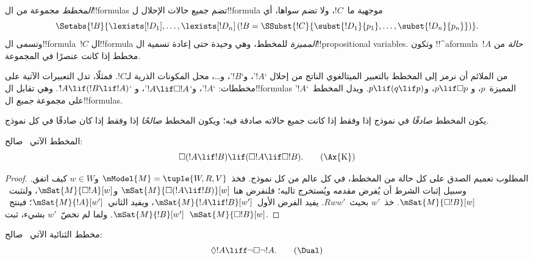 \documentclass[../../../include/open-logic-section]{subfiles}
\begin{document}


\begin{defn}
  \emph{المخطط} مجموعة من ال!!{formula}s تضم جميع حالات الإحلال
  ل!!{formula} موجهية ما~$!C$، ولا تضم سواها، أي
  \[
  \Setabs{!B}{\lexists[!D_1], \dots, \lexists[!D_n] \left(!B =
  \SSubst{!C}{\subst{!D_1}{p_1}, \dots, \subst{!D_n}{p_n}} \right) }.
  \]
  وتسمى ال!!{formula}~$!C$ ال!!{formula} \emph{المميزة} للمخطط، وهي
  وحيدة حتى إعادة تسمية ال!!{propositional variable}s. وتكون
  !!^a{formula}~$!A$ \emph{حالة} من مخطط إذا كانت عنصرًا في المجموعة.
\end{defn}

من الملائم أن نرمز إلى المخطط بالتعبير الميتالغوي الناتج من إحلال
`$!A$'، و`$!B$'، و\dots، محل المكونات الذرية لـ$!C$. فمثلًا، تدل
التعبيرات الآتية على مخططات: `$!A$'، و`$!A \lif \Box!A$'، و
`$!A \lif (!B \lif !A)$'. وهي تقابل ال!!{formula}s المميزة~$p$، و
$p \lif \Box p$، و$p \lif (q \lif p)$. ويدل المخطط~`$!A$' على
مجموعة \emph{جميع} ال!!{formula}s.

\begin{defn}
  يكون المخطط \emph{صادقًا} في نموذج إذا وفقط إذا كانت جميع حالاته
  صادقة فيه؛ ويكون المخطط \emph{صالحًا} إذا وفقط إذا كان صادقًا في كل
  نموذج.
\end{defn}

\begin{prop}
  المخطط الآتي~ صالح:
  \begin{equation*}
  \Box(!A \lif !B) \lif (\Box !A \lif \Box !B). \tag{\Ax{K}}
  \end{equation*}
\end{prop}

\begin{proof}
  المطلوب تعميم الصدق على كل حالة من المخطط، في كل عالم من كل
  نموذج. فخذ~$\mModel{M} = \tuple{W,R,V}$ و$w \in W$ كيف اتفق.
  وسبيل إثبات الشرط أن يُفرض مقدمه ويُستخرج تاليه؛ فلنفرض هنا
  $\mSat{M}{\Box(!A \lif !B)}[w]$ و$\mSat{M}{\Box !A}[w]$،
  ولنثبت~$\mSat{M}{\Box !B}[w]$. خذ~$w'$ بحيث~$Rww'$.
  يفيد الفرض الأول~$\mSat{M}{!A \lif !B}[w']$،
  ويفيد الثاني~$\mSat{M}{!A}[w']$؛ فينتج~$\mSat{M}{!B}[w']$.
  ولما لم نخصّ~$w'$ بشيء، ثبت~$\mSat{M}{\Box !B}[w]$.
\end{proof}

\begin{prop}
  مخطط الثنائية الآتي~\Dual{} صالح:
  \begin{equation*}
  \Diamond !A \liff \lnot\Box\lnot !A. \tag{\Dual}
  \end{equation*}
\end{prop}
\end{document}
